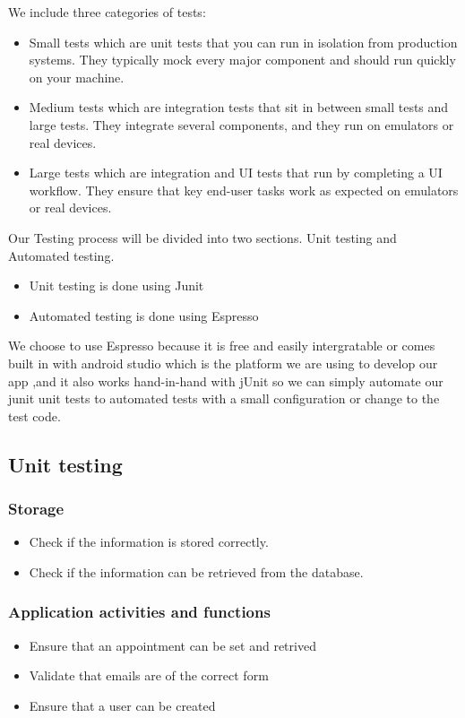 \documentclass[english]{article}
\begin{document}
	We include three categories of tests:
	
		\begin{itemize} 
			\item Small tests which are unit tests that you can run in isolation from production systems. They typically mock every major component and should run 				quickly on your machine.
			\item Medium tests which are integration tests that sit in between small tests and large tests. They integrate several components, and they run on 						emulators or real devices.
			\item Large tests which are integration and UI tests that run by completing a UI workflow. They ensure that key end-user tasks work as expected on 						emulators or real devices.
		\end{itemize}
		Our Testing process will be divided into two sections. Unit testing and Automated testing. 
		\begin{itemize} 
			\item Unit testing is done using Junit
			\item Automated testing is done using Espresso
		
		\end{itemize}
	We choose to use Espresso because it is free and easily intergratable or comes built in with android studio which is the platform we are using to develop our app ,and it also works hand-in-hand with jUnit so we can simply automate our junit unit tests to automated tests with a small configuration or change to the test code.
			

	
	\subsection {Unit testing}
			\subsubsection{Storage}
		\begin{itemize} 
			\item Check if the information is stored correctly.
			\item Check if the information can be retrieved from the database.
		\end{itemize}
			\subsubsection{Application activities and functions}
			\begin{itemize}
				\item Ensure that an appointment can be set and retrived
				\item Validate that emails are of the correct form 
				\item Ensure that a user can be created
			\end{itemize}
	
\end{document}
